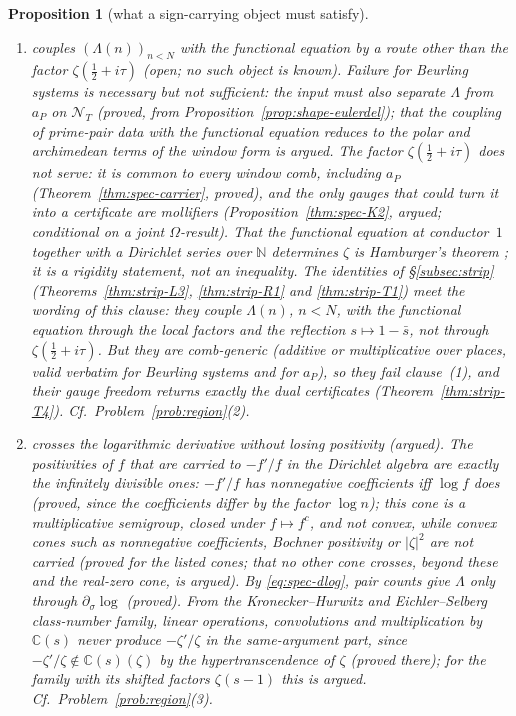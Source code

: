 \documentclass[11pt]{amsart}
\newtheorem{proposition}[theorem]{Proposition}
\theoremstyle{definition}
\theoremstyle{remark}
\newcommand{\C}{\mathbb C}
\newcommand{\N}{\mathbb N}
\newcommand{\NT}{\mathcal N_T}
\begin{document}
\begin{proposition}[what a sign-carrying object must satisfy]
\begin{enumerate}
$a_P$ differs from $\Lambda$ by such an $e$, has the same zeros, and fails $\mathrm{WP}_T$ on $[0.60,\frac12\log P]$
(Proposition~\ref{prop:shape-eulerdel}). So no sparse-stable property, even together with any statement about the zeros, yields
$\mathrm{WP}_T(\Lambda)$ at any $T\ge0.60$. Cf.\ Problem~\ref{prob:region}(1),(2).
\item[(5)] couples $(\Lambda(n))_{n<N}$ with the functional equation by a route other than the factor $\zeta(\frac12+i\tau)$
(\emph{open}; no such object is known). Failure for Beurling systems is necessary but not sufficient: the input must also separate
$\Lambda$ from $a_P$ on $\NT$ (proved, from Proposition~\ref{prop:shape-eulerdel}); that the coupling of prime-pair data with the
functional equation reduces to the polar and archimedean terms of the window form is \emph{argued}. The factor $\zeta(\frac12+i\tau)$
does not serve: it is common to every window comb, including $a_P$ (Theorem~\ref{thm:spec-carrier}, proved), and the only gauges that
could turn it into a certificate are mollifiers (Proposition~\ref{thm:spec-K2}, argued; conditional on a joint $\Omega$-result). That the functional
equation at conductor~$1$ together with a Dirichlet series over $\N$ determines $\zeta$ is Hamburger's theorem \cite{Hamburger1921};
it is a rigidity statement, not an inequality. The identities of \S\ref{subsec:strip} (Theorems~\ref{thm:strip-L3}, \ref{thm:strip-R1} and \ref{thm:strip-T1}) meet the wording of this clause: they couple $\Lambda(n)$, $n<N$, with the functional equation through the local factors and the reflection $s\mapsto1-\bar s$, not through $\zeta(\frac12+i\tau)$. But they are comb-generic (additive or multiplicative over places, valid verbatim for Beurling systems and for $a_P$), so they fail clause~(1), and their gauge freedom returns exactly the dual certificates (Theorem~\ref{thm:strip-T4}). Cf.\ Problem~\ref{prob:region}(2).
\item[(6)] crosses the logarithmic derivative without losing positivity (\emph{argued}). The positivities of $f$ that are carried to
$-f'/f$ in the Dirichlet algebra are exactly the infinitely divisible ones: $-f'/f$ has nonnegative coefficients iff $\log f$ does
(proved, since the coefficients differ by the factor $\log n$); this cone is a multiplicative semigroup, closed under $f\mapsto f^c$,
and not convex, while convex cones such as nonnegative coefficients, Bochner positivity or $|\zeta|^2$ are not carried (proved for the
listed cones; that no other cone crosses, beyond these and the real-zero cone, is argued). By \eqref{eq:spec-dlog}, pair counts give
$\Lambda$ only through $\partial_\sigma\log$ (proved). From the Kronecker--Hurwitz and Eichler--Selberg class-number family, linear
operations, convolutions and multiplication by $\C(s)$ never produce $-\zeta'/\zeta$ in the same-argument part, since
$-\zeta'/\zeta\notin\C(s)(\zeta)$ by the hypertranscendence of $\zeta$ \cite{Holder1887,Ostrowski1920} (proved there); for the family with
its shifted factors $\zeta(s-1)$ this is argued. Cf.\ Problem~\ref{prob:region}(3).
\end{enumerate}
\end{proposition}
\end{document}
